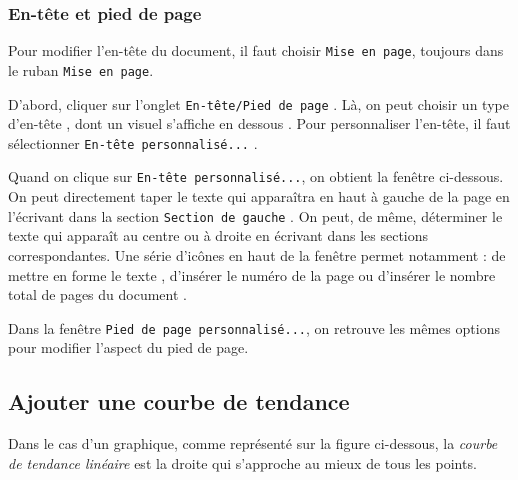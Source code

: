 


\subsubsection{En-tête et pied de page}

Pour modifier l'en-tête du document, il faut choisir \texttt{Mise en page}, toujours dans le ruban \texttt{Mise en page}.

D'abord, cliquer sur l'onglet \texttt{En-tête/Pied de page} . Là, on peut choisir un type d'en-tête , dont un visuel s'affiche en dessous . Pour personnaliser l'en-tête, il faut sélectionner \texttt{En-tête personnalisé...} .


Quand on clique sur \texttt{En-tête personnalisé...}, on obtient la fenêtre ci-dessous. On peut directement taper le texte qui apparaîtra en haut à gauche de la page en l'écrivant dans la section \texttt{Section de gauche} . On peut, de même, déterminer le texte qui apparaît au centre ou à droite en écrivant dans les sections correspondantes. Une série d'icônes en haut de la fenêtre permet notamment : de mettre en forme le texte , d'insérer le numéro de la page  ou d'insérer le nombre total de pages du document .



Dans la fenêtre \texttt{Pied de page personnalisé...}, on retrouve les mêmes options pour modifier l'aspect du pied de page.





\subsection{Ajouter une courbe de tendance}\label{Calc2CourbeTendance} 

Dans le cas d'un graphique, comme représenté sur la figure ci-dessous, la \emph{courbe de tendance linéaire} est la droite qui s'approche au mieux de tous les points. 



